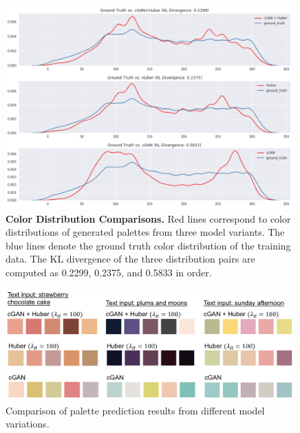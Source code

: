 \documentclass[runningheads]{llncs}
\begin{document}
\begin{figure}[h!]
\centering 
\includegraphics[width=0.99\textwidth]{./Lab_distribution.png}
\vspace*{-2mm}\caption{\textbf{Color Distribution Comparisons.} Red lines correspond to color distributions of generated palettes from three model variants. The blue lines denote the ground truth color distribution of the training data. The KL divergence of the three distribution pairs are computed as 0.2299, 0.2375, and 0.5833 in order.}\label{fig:Lab_distribution}
\end{figure}

\begin{figure}[h!]
\centering 
\includegraphics[width=0.99\textwidth]{./distribution_palette_example.png}
\vspace*{-2mm}\caption{Comparison of palette prediction results from different model variations.}\label{fig:dist_palette_ex}
\end{figure}
\end{document}
